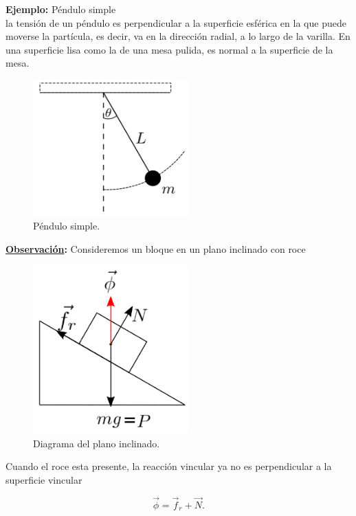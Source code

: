 \documentclass[12pt]{report}
\begin{document}
\textbf{Ejemplo:} Péndulo simple \\ 

la tensión de un péndulo es perpendicular a la superficie esférica en la que puede moverse la partícula, es decir, va en la dirección radial, a lo largo de la varilla. En una superficie lisa como la de una mesa pulida, es normal a la superficie de la mesa.

\begin{figure}[H]
	\begin{center}
	\includegraphics[width=6cm]{figura22.png} 
	\caption{ Péndulo simple.}
	\label{fig.1}
	\end{center}
\end{figure}


\textbf{\underline{Observación}:} Consideremos un bloque en un plano inclinado con roce 

\begin{figure}[H]
	\begin{center}
	\includegraphics[width=6cm]{figura23.png} 
	\caption{ Diagrama del plano inclinado.}
	\label{fig.1}
	\end{center}
\end{figure}

Cuando el roce esta presente, la reacción vincular ya no es perpendicular a la superficie vincular

\begin{equation}
\vec{\phi} = \vec{f}_r + \vec{N}.
\end{equation}
\end{document}
